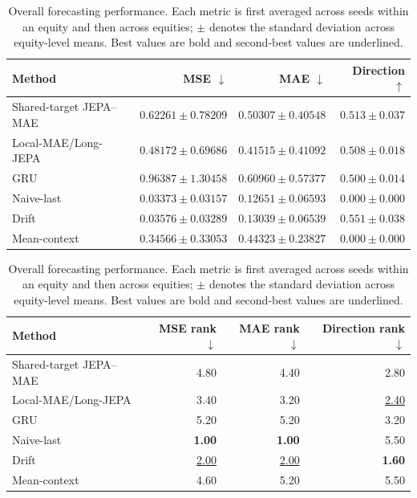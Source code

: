 \begin{table}[t]
\centering
\small
\caption{Overall forecasting performance. Each metric is first averaged across seeds within an equity and then across equities; $\pm$ denotes the standard deviation across equity-level means. Best values are bold and second-best values are underlined.}
\label{tab:main_metrics}
\begin{tabular}{lrrr}
\toprule
Method & MSE $\downarrow$ & MAE $\downarrow$ & Direction $\uparrow$ \\
\midrule
Shared-target JEPA--MAE & $0.62261 \pm 0.78209$ & $0.50307 \pm 0.40548$ & \underline{$0.513 \pm 0.037$} \\
Local-MAE/Long-JEPA & $0.48172 \pm 0.69686$ & $0.41515 \pm 0.41092$ & $0.508 \pm 0.018$ \\
GRU & $0.96387 \pm 1.30458$ & $0.60960 \pm 0.57377$ & $0.500 \pm 0.014$ \\
Naive-last & \textbf{$0.03373 \pm 0.03157$} & \textbf{$0.12651 \pm 0.06593$} & $0.000 \pm 0.000$ \\
Drift & \underline{$0.03576 \pm 0.03289$} & \underline{$0.13039 \pm 0.06539$} & \textbf{$0.551 \pm 0.038$} \\
Mean-context & $0.34566 \pm 0.33053$ & $0.44323 \pm 0.23827$ & $0.000 \pm 0.000$ \\
\bottomrule
\end{tabular}
\par\medskip
\begin{tabular}{lrrr}
\toprule
Method & MSE rank $\downarrow$ & MAE rank $\downarrow$ & Direction rank $\downarrow$ \\
\midrule
Shared-target JEPA--MAE & 4.80 & 4.40 & 2.80 \\
Local-MAE/Long-JEPA & 3.40 & 3.20 & \underline{2.40} \\
GRU & 5.20 & 5.20 & 3.20 \\
Naive-last & \textbf{1.00} & \textbf{1.00} & 5.50 \\
Drift & \underline{2.00} & \underline{2.00} & \textbf{1.60} \\
Mean-context & 4.60 & 5.20 & 5.50 \\
\bottomrule
\end{tabular}
\end{table}
